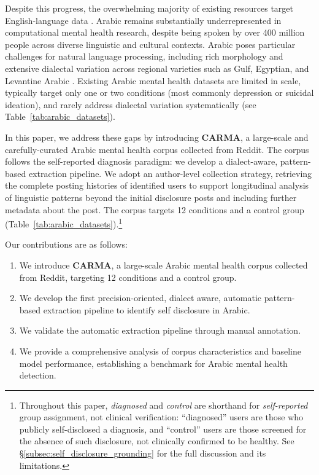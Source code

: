 \documentclass[letterpaper]{article} %
\begin{document}
Despite this progress, the overwhelming majority of existing resources target English-language data \cite{harrigian2021state}. Arabic remains substantially underrepresented in computational mental health research, despite being spoken by over 400 million people across diverse linguistic and cultural contexts. Arabic poses particular challenges for natural language processing, including rich morphology and extensive dialectal variation across regional varieties such as Gulf, Egyptian, and Levantine Arabic \cite{darwish2021panorama,habash2010introduction}. Existing Arabic mental health datasets are limited in scale, typically target only one or two conditions (most commonly depression or suicidal ideation), and rarely address dialectal variation systematically (see Table~\ref{tab:arabic_datasets}).

In this paper, we address these gaps by introducing \textbf{CARMA}, a large-scale and carefully-curated Arabic mental
health corpus collected from Reddit. The corpus follows the self-reported
diagnosis paradigm: we develop a dialect-aware, pattern-based extraction pipeline. We adopt an author-level collection strategy, retrieving the complete posting histories of
identified users to support longitudinal analysis of linguistic patterns beyond the initial disclosure posts and including further metadata about the post. The corpus targets 12 conditions and a control group (Table~\ref{tab:arabic_datasets}).\footnote{Throughout this paper, \textit{diagnosed} and \textit{control} are shorthand for \textit{self-reported} group assignment, not clinical verification: ``diagnosed'' users are those who publicly self-disclosed a diagnosis, and ``control'' users are those screened for the absence of such disclosure, not clinically confirmed to be healthy. See \S\ref{subsec:self_disclosure_grounding} for the full discussion and its limitations.}

Our contributions are as follows:
\begin{enumerate}
    \item We introduce \textbf{CARMA}, a large-scale Arabic mental health corpus
    collected from Reddit, targeting 12 conditions and a control group.

    \item We develop the first precision-oriented, dialect aware, automatic pattern-based extraction pipeline to identify self disclosure in Arabic.

    \item We validate the automatic extraction pipeline through manual annotation.

    \item We provide a comprehensive analysis of corpus characteristics and
    baseline model performance, establishing a benchmark for Arabic mental health detection.

\end{enumerate}
\end{document}
